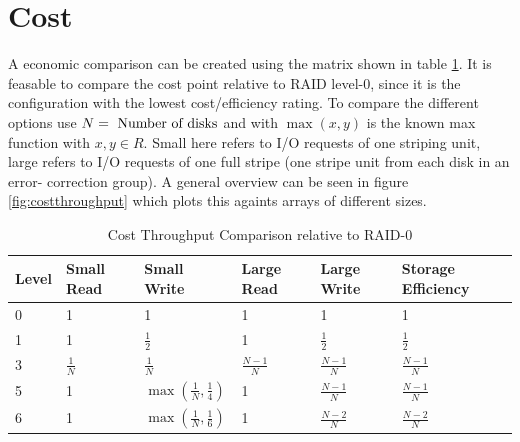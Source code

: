 \documentclass{article}
\begin{document}
\section{Cost}
A economic comparison can be created using the matrix shown in table \ref{tab:economics}.
It is feasable to compare the cost point relative to RAID level-0, since it
is the configuration with the lowest cost/efficiency rating.
To compare the different options use \( N = \textnormal{ Number of disks}\)
and with \(\max\left(x,y\right)\) is the known max function with \( x, y \in R \).
Small here refers to I/O requests of one striping unit, large refers to I/O requests of one full stripe (one stripe unit from each disk in an error-
correction group). A general overview can be seen in figure \ref{fig:costthroughput} which 
plots this againts arrays of different sizes. \cite{cmu:raidhighperf}
\begin{table}[h]
    \begin{tabularx}{\textwidth}{l|X|X|X|X|X}
        \textbf{Level} &
        Small Read &
        Small Write &
        Large Read &
        Large Write &
        Storage Efficiency \\
        \hline
        0 & 1 & 1 & 1 & 1 & 1 \\
        1 & 1 & \( \frac{1}{2} \) & 1 & \( \frac{1}{2} \) & \( \frac{1}{2} \) \\
        3 & \( \frac{1}{N} \) & \( \frac{1}{N} \) & \( \frac{N-1}{N} \) & \( \frac{N-1}{N} \) & \( \frac{N-1}{N} \) \\
        5 & 1 & \( \max\left(\frac{1}{N},\frac{1}{4}\right) \) & 1 & \( \frac{N-1}{N} \) & \( \frac{N-1}{N} \) \\
        6 & 1 & \( \max\left(\frac{1}{N},\frac{1}{6}\right) \) & 1 & \( \frac{N-2}{N} \) & \( \frac{N-2}{N} \) \\
    \end{tabularx}
    \caption{Cost Throughput Comparison relative to RAID-0 \cite{cmu:raidhighperf}}
    \label{tab:economics}
\end{table}
\pagebreak
\end{document}
